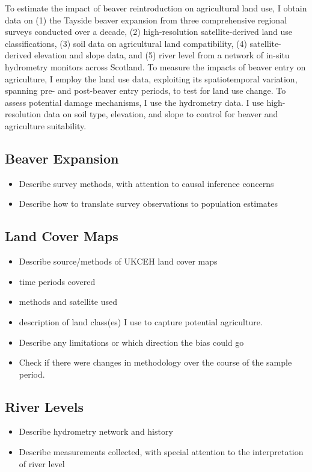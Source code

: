 To estimate the impact of beaver reintroduction on agricultural land use, I obtain data on (1) the Tayside beaver expansion from three comprehensive regional surveys conducted over a decade, (2) high-resolution satellite-derived land use classifications, (3) soil data on agricultural land compatibility, (4) satellite-derived elevation and slope data, and (5) river level from a network of in-situ hydrometry monitors across Scotland. To measure the impacts of beaver entry on agriculture, I employ the land use data, exploiting its spatiotemporal variation, spanning pre- and post-beaver entry periods, to test for land use change. To assess potential damage mechanisms, I use the hydrometry data. I use high-resolution data on soil type, elevation, and slope to control for beaver and agriculture suitability.

\subsection{Beaver Expansion}
\begin{itemize}
    \item Describe survey methods, with attention to causal inference concerns
    \item Describe how to translate survey observations to population estimates
\end{itemize}

\subsection{Land Cover Maps}
\begin{itemize}
    \item Describe source/methods of UKCEH land cover maps
    \item time periods covered
    \item methods and satellite used
    \item description of land class(es) I use to capture potential agriculture.
    \item Describe any limitations or which direction the bias could go
    \item Check if there were changes in methodology over the course of the sample period.
\end{itemize}

\subsection{River Levels}
\begin{itemize}
    \item Describe hydrometry network and history
    \item Describe measurements collected, with special attention to the interpretation of river level
\end{itemize}

